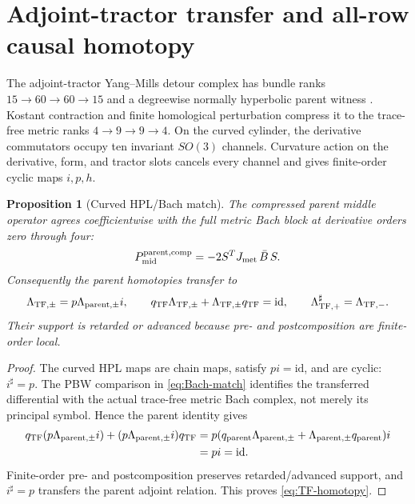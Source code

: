 \documentclass[11pt]{article}
\newtheorem{proposition}[theorem]{Proposition}
\theoremstyle{definition}
\theoremstyle{remark}
\newcommand{\id}{\mathrm{id}}
\begin{document}
\section{Adjoint-tractor transfer and all-row causal homotopy}
\label{sec:tractor}

The adjoint-tractor Yang--Mills detour complex has bundle ranks
$15\to60\to60\to15$ and a degreewise normally hyperbolic parent witness
\cite{GoverSombergSoucek}.  Kostant contraction and finite homological
perturbation compress it to the trace-free metric ranks $4\to9\to9\to4$.
On the curved cylinder, the derivative commutators occupy ten invariant
$SO(3)$ channels.  Curvature action on the derivative, form, and tractor
slots cancels every channel and gives finite-order cyclic maps $i,p,h$.

\begin{proposition}[Curved HPL/Bach match]\label{prop:Bach-match}
The compressed parent middle operator agrees coefficientwise with the full
metric Bach block at derivative orders zero through four:
\begin{equation}\label{eq:Bach-match}
 P_{\rm mid}^{\rm parent,comp}
 =-2S^TJ_{\rm met}\,\bar B\,S.
\end{equation}
Consequently the parent homotopies transfer to
\begin{equation}\label{eq:TF-homotopy}
 \Lambda_{{\rm TF},\pm}=p\Lambda_{{\rm parent},\pm}i,
 \qquad
 q_{\rm TF}\Lambda_{{\rm TF},\pm}
 +\Lambda_{{\rm TF},\pm}q_{\rm TF}=\id,
 \qquad
 \Lambda_{{\rm TF},+}^\sharp=\Lambda_{{\rm TF},-}.
\end{equation}
Their support is retarded or advanced because pre- and postcomposition are
finite-order local.
\end{proposition}

\begin{proof}
The curved HPL maps are chain maps, satisfy $pi=\id$, and are cyclic:
$i^\sharp=p$.  The PBW comparison in \eqref{eq:Bach-match} identifies the
transferred differential with the actual trace-free metric Bach complex,
not merely its principal symbol.  Hence the parent identity gives
\begin{align*}
 q_{\rm TF}(p\Lambda_{{\rm parent},\pm}i)
 +(p\Lambda_{{\rm parent},\pm}i)q_{\rm TF}
 &=p(q_{\rm parent}\Lambda_{{\rm parent},\pm}
 +\Lambda_{{\rm parent},\pm}q_{\rm parent})i\\
 &=pi=\id.
\end{align*}
Finite-order pre- and postcomposition preserves retarded/advanced support,
and $i^\sharp=p$ transfers the parent adjoint relation.  This proves
\eqref{eq:TF-homotopy}.
\end{proof}
\end{document}
